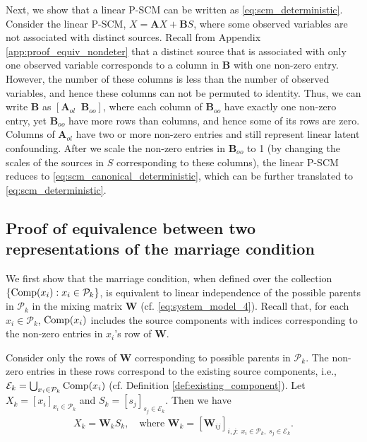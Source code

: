\documentclass[12pt]{article}
\newcommand{\bA}{\mathbf{A}}
\newcommand{\bB}{\mathbf{B}}
\newcommand{\bW}{\mathbf{W}}
\begin{document}
Next, we show that a linear P-SCM can be written as \eqref{eq:scm_deterministic}. Consider the linear P-SCM, $X=\bA X+\bB S$, where some observed variables are not associated with distinct sources. Recall from Appendix \ref{app:proof_equiv_nondeter} that a distinct source that is associated with only one observed variable corresponds to a column in $\bB$ with one non-zero entry. However, the number of these columns is less than the number of observed variables, and hence these columns can not be permuted to identity. Thus, we can write $\bB$ as $[\bA_{ol} \;\; \bB_{oo}]$, where each column of $\bB_{oo}$ have exactly one non-zero entry, yet $\bB_{oo}$ have more rows than columns, and hence some of its rows are zero. Columns of $\bA_{ol}$ have two or more non-zero entries and still represent linear latent confounding. After we scale the non-zero entries in $\bB_{oo}$ to 1 (by changing the scales of the sources in $S$ corresponding to these columns), the linear P-SCM reduces to %
\eqref{eq:scm_canonical_deterministic}, which can be further translated to \eqref{eq:scm_deterministic}.


\subsection{Proof of equivalence between two representations of the marriage condition} \label{app:proof_marriage}
We first show that the marriage condition, when defined over the collection $\{{\rm{Comp}}(x_i):x_i\in \mathcal{P}_k\}$, is equivalent to linear independence of the possible parents in $\mathcal{P}_k$ in the mixing matrix $\bW$ (cf. \eqref{eq:system_model_4}). Recall that, for each $x_i\in \mathcal{P}_k$, ${\rm{Comp}}(x_i)$ includes the source components with indices corresponding to the non-zero entries in $x_i$'s row of $\bW$. 

Consider only the rows of $\bW$ corresponding to possible parents in $\mathcal{P}_k$. The non-zero entries in these rows correspond to the existing source components, i.e., $\mathcal{E}_k=\bigcup_{x_i\in \mathcal{P}_k}{\rm{Comp}}(x_i)$ (cf. Definition \ref{def:existing_component}). Let $X_k= [x_i]_{x_i\in \mathcal{P}_k}$ and $S_k=[s_j]_{s_j\in \mathcal{E}_k}$. Then we have
\begin{align}
X_k = \bW_k S_k,\quad \text {where } \bW_k = \left[\bW_{ij}\right]_{i,j:\;x_i\in \mathcal{P}_k,\;s_j\in \mathcal{E}_k}.
\label{eq:marriage_condition_rank_1}
\end{align}
\end{document}
